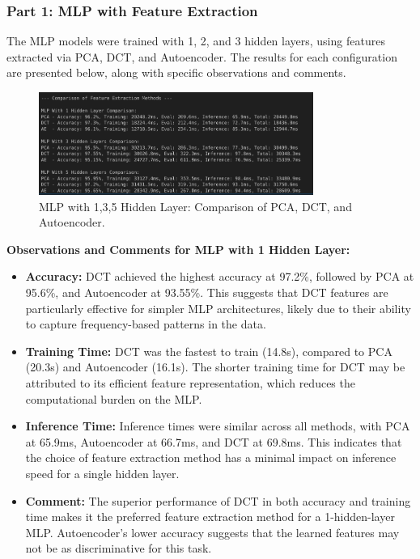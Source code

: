 \documentclass[a4paper,12pt]{article}
\begin{document}
\subsubsection{Part 1: MLP with Feature Extraction}
The MLP models were trained with 1, 2, and 3 hidden layers, using features extracted via PCA, DCT, and Autoencoder. The results for each configuration are presented below, along with specific observations and comments.

\begin{figure}[H]
    \centering
    \includegraphics[width=0.8\textwidth]{MLPlayers.png}
    \caption{MLP with 1,3,5 Hidden Layer: Comparison of PCA, DCT, and Autoencoder.}
    \label{fig:mlp_1_hidden}
\end{figure}

\textbf{Observations and Comments for MLP with 1 Hidden Layer:}
\begin{itemize}
    \item \textbf{Accuracy:} DCT achieved the highest accuracy at 97.2\%, followed by PCA at 95.6\%, and Autoencoder at 93.55\%. This suggests that DCT features are particularly effective for simpler MLP architectures, likely due to their ability to capture frequency-based patterns in the data.
    \item \textbf{Training Time:} DCT was the fastest to train (14.8s), compared to PCA (20.3s) and Autoencoder (16.1s). The shorter training time for DCT may be attributed to its efficient feature representation, which reduces the computational burden on the MLP.
    \item \textbf{Inference Time:} Inference times were similar across all methods, with PCA at 65.9ms, Autoencoder at 66.7ms, and DCT at 69.8ms. This indicates that the choice of feature extraction method has a minimal impact on inference speed for a single hidden layer.
    \item \textbf{Comment:} The superior performance of DCT in both accuracy and training time makes it the preferred feature extraction method for a 1-hidden-layer MLP. Autoencoder's lower accuracy suggests that the learned features may not be as discriminative for this task.
\end{itemize}
\end{document}
